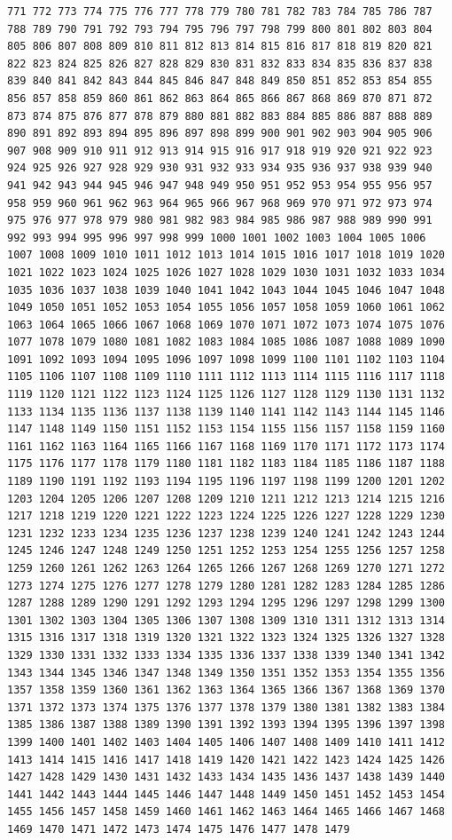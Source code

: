 \documentclass[11pt,]{article}
\begin{document}
\begin{verbatim}
771 772 773 774 775 776 777 778 779 780 781 782 783 784 785 786 787 788 789 790 791 792 793 794 795 796 797 798 799 800 801 802 803 804 805 806 807 808 809 810 811 812 813 814 815 816 817 818 819 820 821 822 823 824 825 826 827 828 829 830 831 832 833 834 835 836 837 838 839 840 841 842 843 844 845 846 847 848 849 850 851 852 853 854 855 856 857 858 859 860 861 862 863 864 865 866 867 868 869 870 871 872 873 874 875 876 877 878 879 880 881 882 883 884 885 886 887 888 889 890 891 892 893 894 895 896 897 898 899 900 901 902 903 904 905 906 907 908 909 910 911 912 913 914 915 916 917 918 919 920 921 922 923 924 925 926 927 928 929 930 931 932 933 934 935 936 937 938 939 940 941 942 943 944 945 946 947 948 949 950 951 952 953 954 955 956 957 958 959 960 961 962 963 964 965 966 967 968 969 970 971 972 973 974 975 976 977 978 979 980 981 982 983 984 985 986 987 988 989 990 991 992 993 994 995 996 997 998 999 1000 1001 1002 1003 1004 1005 1006 1007 1008 1009 1010 1011 1012 1013 1014 1015 1016 1017 1018 1019 1020 1021 1022 1023 1024 1025 1026 1027 1028 1029 1030 1031 1032 1033 1034 1035 1036 1037 1038 1039 1040 1041 1042 1043 1044 1045 1046 1047 1048 1049 1050 1051 1052 1053 1054 1055 1056 1057 1058 1059 1060 1061 1062 1063 1064 1065 1066 1067 1068 1069 1070 1071 1072 1073 1074 1075 1076 1077 1078 1079 1080 1081 1082 1083 1084 1085 1086 1087 1088 1089 1090 1091 1092 1093 1094 1095 1096 1097 1098 1099 1100 1101 1102 1103 1104 1105 1106 1107 1108 1109 1110 1111 1112 1113 1114 1115 1116 1117 1118 1119 1120 1121 1122 1123 1124 1125 1126 1127 1128 1129 1130 1131 1132 1133 1134 1135 1136 1137 1138 1139 1140 1141 1142 1143 1144 1145 1146 1147 1148 1149 1150 1151 1152 1153 1154 1155 1156 1157 1158 1159 1160 1161 1162 1163 1164 1165 1166 1167 1168 1169 1170 1171 1172 1173 1174 1175 1176 1177 1178 1179 1180 1181 1182 1183 1184 1185 1186 1187 1188 1189 1190 1191 1192 1193 1194 1195 1196 1197 1198 1199 1200 1201 1202 1203 1204 1205 1206 1207 1208 1209 1210 1211 1212 1213 1214 1215 1216 1217 1218 1219 1220 1221 1222 1223 1224 1225 1226 1227 1228 1229 1230 1231 1232 1233 1234 1235 1236 1237 1238 1239 1240 1241 1242 1243 1244 1245 1246 1247 1248 1249 1250 1251 1252 1253 1254 1255 1256 1257 1258 1259 1260 1261 1262 1263 1264 1265 1266 1267 1268 1269 1270 1271 1272 1273 1274 1275 1276 1277 1278 1279 1280 1281 1282 1283 1284 1285 1286 1287 1288 1289 1290 1291 1292 1293 1294 1295 1296 1297 1298 1299 1300 1301 1302 1303 1304 1305 1306 1307 1308 1309 1310 1311 1312 1313 1314 1315 1316 1317 1318 1319 1320 1321 1322 1323 1324 1325 1326 1327 1328 1329 1330 1331 1332 1333 1334 1335 1336 1337 1338 1339 1340 1341 1342 1343 1344 1345 1346 1347 1348 1349 1350 1351 1352 1353 1354 1355 1356 1357 1358 1359 1360 1361 1362 1363 1364 1365 1366 1367 1368 1369 1370 1371 1372 1373 1374 1375 1376 1377 1378 1379 1380 1381 1382 1383 1384 1385 1386 1387 1388 1389 1390 1391 1392 1393 1394 1395 1396 1397 1398 1399 1400 1401 1402 1403 1404 1405 1406 1407 1408 1409 1410 1411 1412 1413 1414 1415 1416 1417 1418 1419 1420 1421 1422 1423 1424 1425 1426 1427 1428 1429 1430 1431 1432 1433 1434 1435 1436 1437 1438 1439 1440 1441 1442 1443 1444 1445 1446 1447 1448 1449 1450 1451 1452 1453 1454 1455 1456 1457 1458 1459 1460 1461 1462 1463 1464 1465 1466 1467 1468 1469 1470 1471 1472 1473 1474 1475 1476 1477 1478 1479 
\end{verbatim}
\end{document}
